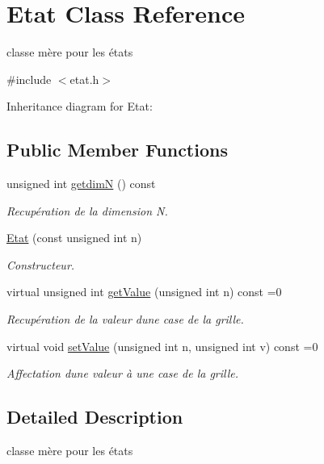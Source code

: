 \hypertarget{class_etat}{}\section{Etat Class Reference}
\label{class_etat}


classe mère pour les états  




{\ttfamily \#include $<$etat.\+h$>$}



Inheritance diagram for Etat\+:
\subsection*{Public Member Functions}
\begin{DoxyCompactItemize}
\item 
unsigned int \mbox{\hyperlink{class_etat_aa30f352f0cd2cc3058a5df552615638c}{getdimN}} () const
\begin{DoxyCompactList}\small\item\em Recupération de la dimension N. \end{DoxyCompactList}\item 
\mbox{\hyperlink{class_etat_a9b4db6036be6e5a88414e07a6c15751d}{Etat}} (const unsigned int n)
\begin{DoxyCompactList}\small\item\em Constructeur. \end{DoxyCompactList}\item 
virtual unsigned int \mbox{\hyperlink{class_etat_a70460d74202413a3fe6849c4bfba7bab}{get\+Value}} (unsigned int n) const =0
\begin{DoxyCompactList}\small\item\em Recupération de la valeur d\textquotesingle{}une case de la grille. \end{DoxyCompactList}\item 
virtual void \mbox{\hyperlink{class_etat_a92ad894e65a419e1cddb335664deea3e}{set\+Value}} (unsigned int n, unsigned int v) const =0
\begin{DoxyCompactList}\small\item\em Affectation d\textquotesingle{}une valeur à une case de la grille. \end{DoxyCompactList}\end{DoxyCompactItemize}


\subsection{Detailed Description}
classe mère pour les états 

